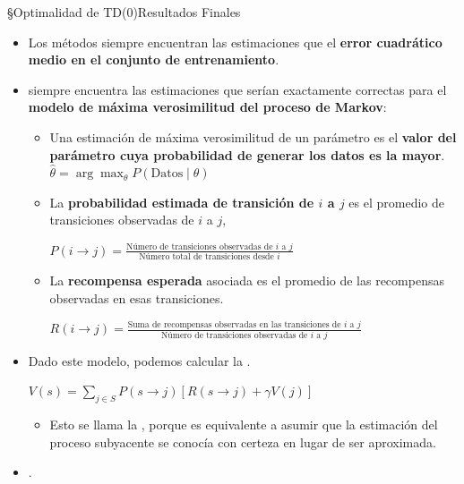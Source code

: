 \documentclass[10pt, envcountsect, handout, aspectratio=1610, hyperref={hypertexnames=true}]{beamer}
\begin{document}
\begin{frame}{\S Optimalidad de TD(0)}{Resultados Finales}

\begin{itemize}
	\item Los métodos  siempre encuentran las estimaciones que  el \textbf{error cuadrático medio en el conjunto de entrenamiento}.
	
	\item {} siempre encuentra las estimaciones que serían exactamente correctas para el \textbf{modelo de máxima verosimilitud del proceso de Markov}:
	\begin{itemize}
		\item Una estimación de máxima verosimilitud de un parámetro es el \textbf{valor del parámetro cuya probabilidad de generar los datos es la mayor}. $\hat{\theta} = \arg \max_{\theta} P(\text{Datos} \mid \theta)$
		
		\item La \textbf{probabilidad estimada de transición de \( i \) a \( j \)} es el {promedio de transiciones observadas de \( i \) a \( j \)}, 
		
		\centerline{$P(i \to j) = \frac{\text{Número de transiciones observadas de } i \text{ a } j}{\text{Número total de transiciones desde } i}$}
		
		\item La \textbf{recompensa esperada} asociada es el promedio de las recompensas observadas en esas transiciones.
		
		\centerline{$R(i \to j) = \frac{\text{Suma de recompensas observadas en las transiciones de } i \text{ a } j}{\text{Número de transiciones observadas de } i \text{ a } j}$}
		
	\end{itemize}
	
	\item Dado este modelo, podemos calcular la .
	
	\centerline{$V(s) = \sum_{j \in S} P(s \to j) \left[ R(s \to j) + \gamma V(j) \right]$}
	
	\begin{itemize}
		\item Esto se llama la , porque es equivalente a asumir que la estimación del proceso subyacente se conocía con certeza en lugar de ser aproximada.
	\end{itemize}
	
	\item {}.
\end{itemize}
\end{frame}
\end{document}
